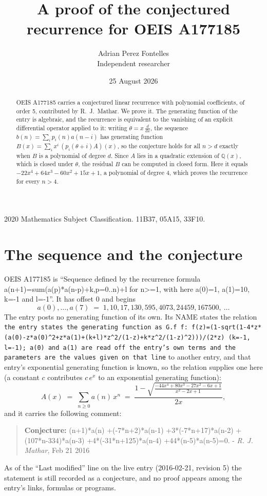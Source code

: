 \documentclass[11pt,a4paper]{article}
\title{A proof of the conjectured recurrence for OEIS A177185}
\author{Adrian Perez Fontelles\\ \small Independent researcher}
\date{25 August 2026}
\theoremstyle{plain}
\theoremstyle{definition}
\begin{document}
\maketitle

\begin{abstract}
OEIS A177185 carries a conjectured linear recurrence with polynomial coefficients, of
order 5, contributed by R.~J.~Mathar. We prove it. The generating function of the
entry is algebraic, and the recurrence is equivalent to the vanishing of an explicit
differential operator applied to it: writing $\theta=x\,\frac{d}{dx}$, the sequence
$b(n)=\sum_{i}p_{i}(n)a(n-i)$ has generating function
$B(x)=\sum_{i}x^{i}\,(p_{i}(\theta+i)A)(x)$, so the conjecture holds for all $n>d$ exactly
when $B$ is a polynomial of degree $d$. Since $A$ lies in a quadratic extension of
$\mathbb{Q}(x)$, which is closed under $\theta$, the residual $B$ can be computed in
closed form. Here it equals $- 22 x^{4} + 64 x^{3} - 60 x^{2} + 15 x + 1$, a polynomial of degree $4$, which proves
the recurrence for every $n>4$.
\end{abstract}

\noindent\small 2020 Mathematics Subject Classification. 11B37, 05A15, 33F10.\normalsize

\section{The sequence and the conjecture}

OEIS A177185 is ``Sequence defined by the recurrence formula a(n+1)=sum(a(p)*a(n-p)+k,p=0..n)+l for n>=1, with here a(0)=1, a(1)=10, k=-1 and l=-1''. It has offset $0$ and begins
\[
a(0),\dots,a(7)\;=\;1, 10, 17, 130, 595, 4073, 24459, 167500,\ \dots
\]
The entry posts no generating function of its own. Its NAME states the
relation \texttt{the entry states the generating function as G.f f: f(z)=(1-sqrt(1-4*z*(a(0)-z*a(0)\textasciicircum{}2+z*a(1)+(k+l)*z\textasciicircum{}2/(1-z)+k*z\textasciicircum{}2/(1-z)\textasciicircum{}2)))/(2*z) (k=-1, l=-1); a(0) and a(1) are read off the entry's own terms and the parameters are the values given on that line} to another entry, and that entry's exponential generating
function is known, so the relation supplies one here (a constant $c$ contributes
$c\,e^{x}$ to an exponential generating function):
\begin{equation}\label{eq:gf}
A(x)\;=\;\sum_{n\ge 0} a(n)\,x^{n}\;=\;\frac{1 - \sqrt{\frac{- 44 x^{4} + 80 x^{3} - 27 x^{2} - 6 x + 1}{x^{2} - 2 x + 1}}}{2 x} ,
\end{equation}
and it carries the following comment:
\begin{quote}\small
\textbf{Conjecture:} (n+1)*a(n) +(-7*n+2)*a(n-1) +3*(-7*n+17)*a(n-2) +(107*n-334)*a(n-3) +4*(-31*n+125)*a(n-4) +44*(n-5)*a(n-5)=0. - \emph{R. J. Mathar}, Feb 21 2016
\end{quote}
As of the ``Last modified'' line on the live entry (2016-02-21, revision 5) the
statement is still recorded as a conjecture, and no proof appears among the entry's links,
formulas or programs.
\end{document}
